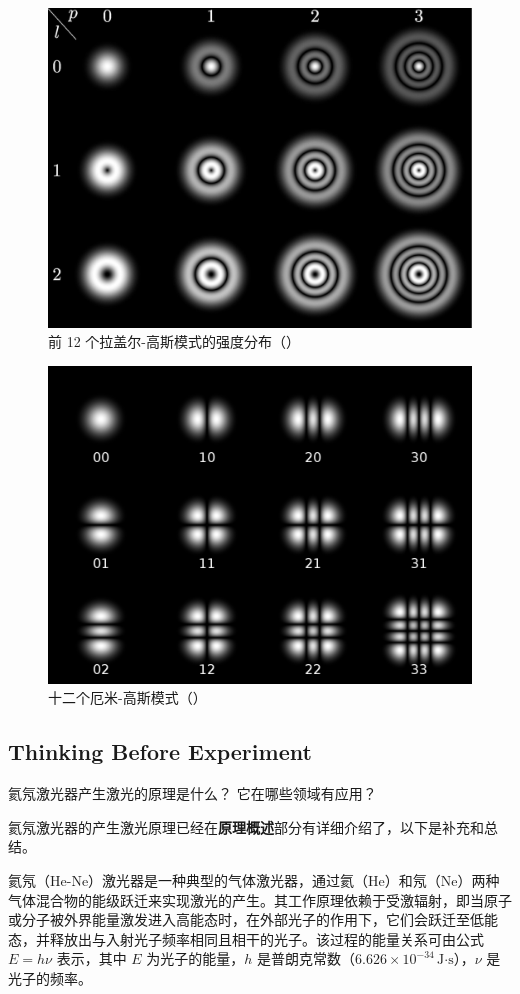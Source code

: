 \begin{enumerate}
\begin{enumerate}
		\begin{figure}[htbp]
			\centering
			\includegraphics[width=0.35\linewidth]{images/APL1_8_Intensity_profiles_of_Laguerre-Gaussian_modes}
			\caption{前 12 个拉盖尔-高斯模式的强度分布（\cite{a}）}
			\label{fig:apl18intensityprofilesoflaguerre-gaussianmodes}
		\end{figure}
		
		\begin{figure}[htbp]
			\centering
			\includegraphics[width=0.37\linewidth]{images/APL1_8_Hermite-gaussian}
			\caption{十二个厄米-高斯模式（\cite{a}）}
			\label{fig:apl18hermite-gaussian}
		\end{figure}
		
	\end{enumerate}
\end{enumerate}


\subsection{Thinking Before Experiment}

\begin{question}
	氦氖激光器产生激光的原理是什么？
	它在哪些领域有应用？
\end{question}
氦氖激光器的产生激光原理已经在\textbf{原理概述}部分有详细介绍了，以下是补充和总结。

氦氖（He-Ne）激光器是一种典型的气体激光器，通过氦（He）和氖（Ne）两种气体混合物的能级跃迁来实现激光的产生。其工作原理依赖于受激辐射，即当原子或分子被外界能量激发进入高能态时，在外部光子的作用下，它们会跃迁至低能态，并释放出与入射光子频率相同且相干的光子。该过程的能量关系可由公式 \(E = h \nu\) 表示，其中 \(E\) 为光子的能量，\(h\) 是普朗克常数（\(6.626 \times 10^{-34} \, \text{J·s}\)），\(\nu\) 是光子的频率。

